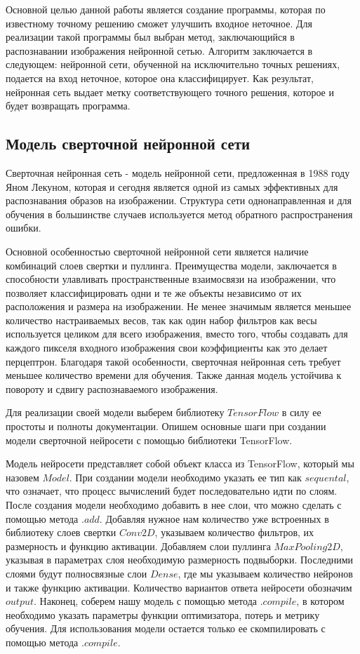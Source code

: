 \documentclass[12pt, a4paper]{article}
\begin{document}
Основной целью данной работы является создание программы, которая по известному точному решению сможет улучшить входное неточное. Для реализации такой программы был выбран метод, заключающийся в распознавании изображения нейронной сетью. Алгоритм заключается в следующем: нейронной сети, обученной на исключительно точных решениях, подается на вход неточное, которое она классифицирует. Как результат, нейронная сеть выдает метку соответствующего точного решения, которое и будет возвращать программа.

\subsection{Модель сверточной нейронной сети}

Сверточная нейронная сеть \cite{1} - модель нейронной сети, предложенная в 1988 году Яном Лекуном, которая и сегодня является одной из самых эффективных для распознавания образов на изображении. Структура сети однонаправленная и для обучения в большинстве случаев используется метод обратного распространения ошибки.

Основной особенностью сверточной нейронной сети является наличие комбинаций слоев свертки и пуллинга. Преимущества модели, заключается в способности улавливать пространственные взаимосвязи на изображении, что позволяет классифицировать одни и те же объекты независимо от их расположения и размера на изображении. Не менее значимым является меньшее количество настраиваемых весов, так как один набор фильтров как весы используется целиком для всего изображения, вместо того, чтобы создавать для каждого пикселя входного изображения свои коэффициенты как это делает перцептрон. Благодаря такой особенности, сверточная нейронная сеть требует меньшее количество времени для обучения. Также данная модель устойчива к повороту и сдвигу распознаваемого изображения. 

Для реализации своей модели выберем библиотеку $TensorFlow$ в силу ее простоты и полноты документации. Опишем основные шаги при создании модели сверточной нейросети с помощью библиотеки TensorFlow. 

 Модель нейросети представляет собой объект класса из TensorFlow, который мы назовем $Model$. При создании модели необходимо указать ее тип как $sequental$, что означает, что процесс вычислений будет последовательно идти по слоям. После создания модели необходимо добавить в нее слои, что можно сделать с помощью метода $.add$. Добавляя нужное нам количество уже встроенных в библиотеку слоев свертки $Conv2D$, указываем количество фильтров, их размерность и функцию активации. Добавляем слои пуллинга $MaxPooling2D$, указывая в параметрах слоя необходимую размерность подвыборки. Последними слоями будут полносвязные слои $Dense$, где мы указываем количество нейронов и также функцию активации. Количество вариантов ответа нейросети обозначим $output$. Наконец, соберем нашу модель с помощью метода $.compile$, в котором необходимо указать параметры функции оптимизатора, потерь и метрику обучения.  Для использования модели остается только ее скомпилировать с помощью метода $.compile$. 
 
\end{document}
